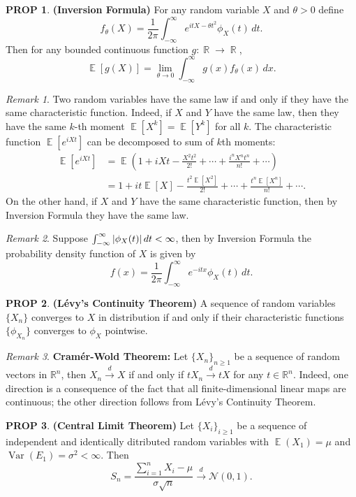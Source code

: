 \documentclass[hidelinks,11pt]{article}
\theoremstyle{definition}
\theoremstyle{dotless}
\newtheorem{prop}{PROP}[section]
\theoremstyle{remark}
\newtheorem*{remark}{Remark}
\DeclareMathOperator{\Var}{Var}
\DeclareMathOperator{\E}{\mathbb{E}}
\DeclareMathOperator{\R}{\mathbb{R}}
\DeclareMathOperator{\1}{\mathbf{1}}
\begin{document}
\begin{prop}\textup{\textbf{(Inversion Formula)}} For any random variable $X$ and $\theta>0$ define
\[f_\theta(X)=\frac{1}{2\pi}\int_{-\infty}^\infty e^{itX-\theta t^2}\phi_X(t)\,dt.\]
Then for any bounded continuous function $g:\R\to\R$,
\[\E[g(X)]=\lim_{\theta\to0}\int_{-\infty}^\infty g(x)f_\theta(x)\,dx.\]
\end{prop}

\begin{remark}
Two random variables have the same law if and only if they have the same characteristic function. Indeed, if $X$ and $Y$ have the same law, then they have the same $k$-th moment $\E[X^k]=\E[Y^k]$ for all $k$. The characteristic function $\E[e^{iXt}]$ can be decomposed to sum of $k$th moments:
\begin{align*}
\E[e^{iXt}]&=\E(1+iXt-\frac{X^2t^2}{2!}+\cdots+\frac{i^nX^nt^n}{n!}+\cdots)\\&=1+it\E[X]-\frac{t^2\E[X^2]}{2!}+\cdots+\frac{t^n\E[X^n]}{n!}+\cdots.
\end{align*}
On the other hand, if $X$ and $Y$ have the same characteristic function, then by Inversion Formula they have the same law.
\end{remark}

\begin{remark}
Suppose $\int_{-\infty}^\infty\abs{\phi_X(t)}\,dt<\infty$, then by Inversion Formula the probability density function of $X$ is given by
\[f(x)=\frac{1}{2\pi}\int_{-\infty}^\infty e^{-itx}\phi_X(t)\,dt.\]
\end{remark}

\begin{prop}\textup{\textbf{(Lévy's Continuity Theorem)}} A sequence of random variables $\{X_n\}$ converges to $X$ in distribution if and only if their characteristic functions $\{\phi_{X_n}\}$ converges to $\phi_X$ pointwise.
\end{prop}

\begin{remark}
\textup{\textbf{Cramér-Wold Theorem:}} Let $\{X_n\}_{n\geq1}$ be a sequence of random vectors in $\mathbb{R}^n$, then $X_n\xrightarrow{d}X$ if and only if $tX_n\xrightarrow{d}tX$ for any $t\in\mathbb{R}^n$. Indeed, one direction is a consequence of the fact that all finite-dimensional linear maps are continuous; the other direction follows from Lévy's Continuity Theorem.
\end{remark}

\begin{prop}\textup{\textbf{(Central Limit Theorem)}} Let $\{X_i\}_{i\geq1}$ be a sequence of independent and identically ditributed random variables with $\E(X_1)=\mu$ and $\Var(E_1)=\sigma^2<\infty$. Then
\[S_n=\frac{\sum_{i=1}^nX_i-\mu}{\sigma\sqrt{n}}\xrightarrow{d}\mathcal{N}(0,1).\]
\end{prop}
\end{document}
